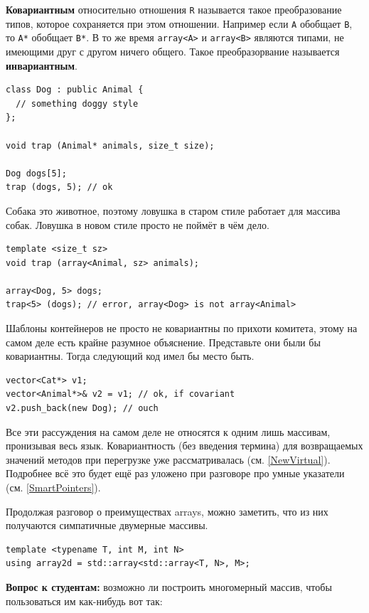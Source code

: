 \documentclass[a4paper,12pt,oneside]{article}
\begin{document}
\textbf{Ковариантным} относительно отношения \lstinline!R! называется такое преобразование типов, которое сохраняется при этом отношении. Например если \lstinline!A! обобщает \lstinline!B!, то \lstinline!A*! обобщает \lstinline!B*!. В то же время \lstinline!array<A>! и \lstinline!array<B>! являются типами, не имеющими друг с другом ничего общего. Такое преобразорвание называется \textbf{инвариантным}.

\begin{lstlisting}
class Dog : public Animal { 
  // something doggy style
};

void trap (Animal* animals, size_t size);

Dog dogs[5];
trap (dogs, 5); // ok
\end{lstlisting}

Собака это животное, поэтому ловушка в старом стиле работает для массива собак. Ловушка в новом стиле просто не поймёт в чём дело.

\begin{lstlisting}
template <size_t sz> 
void trap (array<Animal, sz> animals);

array<Dog, 5> dogs;
trap<5> (dogs); // error, array<Dog> is not array<Animal>
\end{lstlisting}

Шаблоны контейнеров не просто не ковариантны по прихоти комитета, этому на самом деле есть крайне разумное объяснение. Представьте они были бы ковариантны. Тогда следующий код имел бы место быть.

\begin{lstlisting}
vector<Cat*> v1;
vector<Animal*>& v2 = v1; // ok, if covariant
v2.push_back(new Dog); // ouch
\end{lstlisting}

Все эти рассуждения на самом деле не относятся к одним лишь массивам, пронизывая весь язык. Ковариантность (без введения термина) для возвращаемых значений методов при перегрузке уже рассматривалась (см. \ref{NewVirtual}). Подробнее всё это будет ещё раз уложено при разговоре про умные указатели (см. \ref{SmartPointers}).

Продолжая разговор о преимуществах arrays, можно заметить, что из них получаются симпатичные двумерные массивы.

\begin{lstlisting}
template <typename T, int M, int N> 
using array2d = std::array<std::array<T, N>, M>; 
\end{lstlisting}

\textbf{Вопрос к студентам:} возможно ли построить многомерный массив, чтобы пользоваться им как-нибудь вот так:
\end{document}
